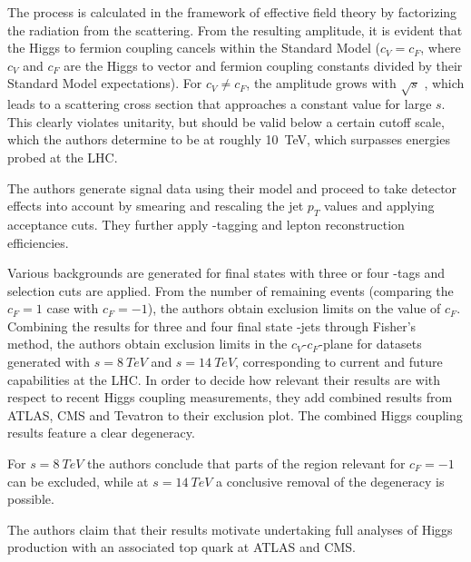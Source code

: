 The process \HepProcess{\PW\Pqb\to\Pqt\Ph} is calculated in the framework of effective field theory by factorizing the \PW radiation from the \Pqb scattering.
From the resulting amplitude, it is evident that the Higgs to fermion coupling cancels within the Standard Model ($c_V = c_F$, where $c_V$ and $c_F$ are the Higgs to vector and fermion coupling constants divided by their Standard Model expectations).
For $c_V \neq c_F$, the amplitude grows with $\sqrt{s}$ , which leads to a scattering cross section that approaches a constant value for large $s$.
This clearly violates unitarity, but should be valid below a certain cutoff scale, which the authors determine to be at roughly \SI{10}{TeV}, which surpasses energies probed at the LHC.

The authors generate signal data using their model and proceed to take detector effects into account by smearing and rescaling the jet $p_T$ values and applying acceptance cuts.
They further apply \Pqb-tagging and lepton reconstruction efficiencies.

Various backgrounds are generated for final states with three or four \Pqb-tags and selection cuts are applied.
From the number of remaining events (comparing the $c_F=1$ case with $c_F=-1$), the authors obtain exclusion limits on the value of $c_F$.
Combining the results for three and four final state \Pqb-jets through Fisher's method, the authors obtain exclusion limits in the $c_V$-$c_F$-plane for datasets generated with $s=\SI{8}{TeV}$ and $s=\SI{14}{TeV}$, corresponding to current and future capabilities at the LHC.
In order to decide how relevant their results are with respect to recent Higgs coupling measurements, they add combined results from ATLAS, CMS and Tevatron \cite{espinosa} to their exclusion plot.
The combined Higgs coupling results feature a clear degeneracy.

For $s=\SI{8}{TeV}$ the authors conclude that parts of the region relevant for $c_F=-1$ can be excluded, while at $s=\SI{14}{TeV}$ a conclusive removal of the degeneracy is possible.

The authors claim that their results motivate undertaking full analyses of Higgs production with an associated top quark at ATLAS and CMS.

\vspace{1em}

\nocite{*}
\printbibliography


